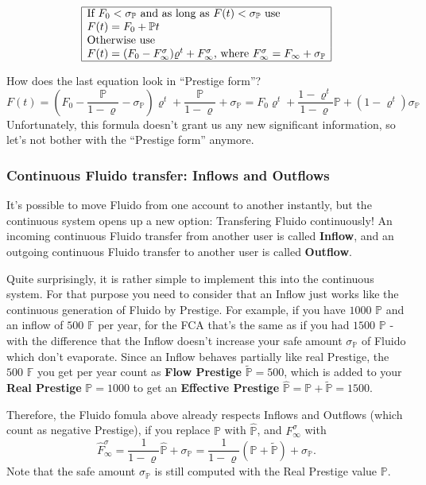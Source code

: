\documentclass[a4paper,12pt]{scrartcl}
\newcounter{formula}
\newcounter{example}
\begin{document}
$$
\begin{array}{|l|}
\hline
\mbox{If } F_0 < \sigma_{\mathbb{P}} \mbox{ and as long as } F(t) < \sigma_{\mathbb{P}} \mbox{ use}\\
F(t)=F_0 + \mathbb{P}t\\
\mbox{Otherwise use}\\
F(t)=(F_0 -F^{\sigma}_{\infty}) \varrho^t + F^{\sigma}_{\infty} \mbox {, where } F^{\sigma}_{\infty} = F_{\infty} + \sigma_{\mathbb{P}} \\
\hline
\end{array}$$

How does the last equation look in ``Prestige form''?
$$F(t)= \left(F_0 - \frac{\mathbb{P}}{1-\varrho} - \sigma_{\mathbb{P}} \right) \varrho^t + \frac{\mathbb{P}}{1-\varrho} + \sigma_{\mathbb{P}} = F_0 \varrho^t + \frac{1 - \varrho^t}{1-\varrho} \mathbb{P} + (1 - \varrho^t)\sigma_{\mathbb{P}}$$
Unfortunately, this formula doesn't grant us any new significant information, so let's not bother with the ``Prestige form'' anymore.

\subsubsection{Continuous Fluido transfer: Inflows and Outflows}
It's possible to move Fluido from one account to another instantly, but the continuous system opens up a new option: Transfering Fluido continuously! An incoming continuous Fluido transfer from another user is called \textbf{Inflow}, and an outgoing continuous Fluido transfer to another user is called \textbf{Outflow}.

Quite surprisingly, it is rather simple to implement this into the continuous system. For that purpose you need to consider that an Inflow just works like the continuous generation of Fluido by Prestige. For example, if you have $1000$ $\mathbb{P}$ and an inflow of $500$ $\mathbb{F}$ per year, for the FCA that's the same as if you had $1500$ $\mathbb{P}$ - with the difference that the Inflow doesn't increase your safe amount $\sigma_{\mathbb{P}}$ of Fluido which don't evaporate. Since an Inflow behaves partially like real Prestige, the $500$ $\mathbb{F}$ you get per year count as \textbf{Flow Prestige} $\tilde{\mathbb{P}}=500$, which is added to your \textbf{Real Prestige} $\mathbb{P}=1000$ to get an \textbf{Effective Prestige} $\hat{\mathbb{P}}=\mathbb{P}+\tilde{\mathbb{P}}=1500$.

Therefore, the Fluido fomula above already respects Inflows and Outflows (which count as negative Prestige), if you replace $\mathbb{P}$ with $\hat{\mathbb{P}}$, and $F^{\sigma}_{\infty}$ with
$$\hat{F}^{\sigma}_{\infty} = \frac{1}{1-\varrho} \hat{\mathbb{P}} + \sigma_{\mathbb{P}} = \frac{1}{1-\varrho} (\mathbb{P} + \tilde{\mathbb{P}}) + \sigma_{\mathbb{P}}.$$ 
Note that the safe amount $\sigma_{\mathbb{P}}$ is still computed with the Real Prestige value $\mathbb{P}$.
\end{document}
